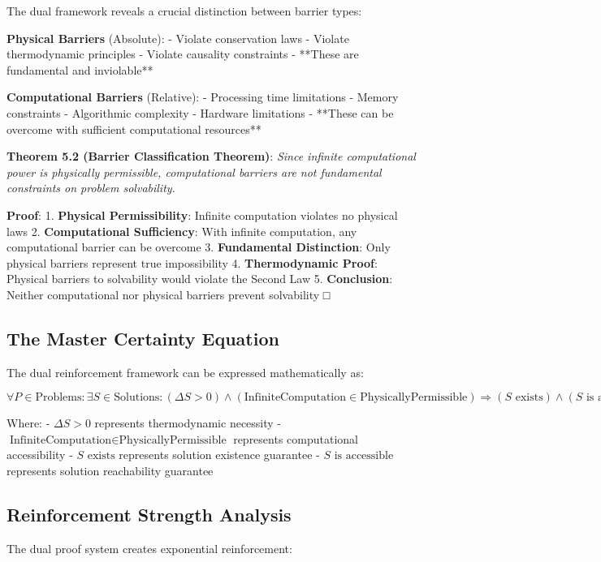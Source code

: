 \documentclass[12pt,a4paper]{article}
\theoremstyle{definition}
\begin{document}
{The dual framework reveals a crucial distinction between barrier types:

\textbf{Physical Barriers} (Absolute):
- Violate conservation laws
- Violate thermodynamic principles
- Violate causality constraints
- **These are fundamental and inviolable**

\textbf{Computational Barriers} (Relative):
- Processing time limitations
- Memory constraints
- Algorithmic complexity
- Hardware limitations
- **These can be overcome with sufficient computational resources**

\textbf{Theorem 5.2 (Barrier Classification Theorem)}: \textit{Since infinite computational power is physically permissible, computational barriers are not fundamental constraints on problem solvability.}

\textbf{Proof}:
1. \textbf{Physical Permissibility}: Infinite computation violates no physical laws
2. \textbf{Computational Sufficiency}: With infinite computation, any computational barrier can be overcome
3. \textbf{Fundamental Distinction}: Only physical barriers represent true impossibility
4. \textbf{Thermodynamic Proof}: Physical barriers to solvability would violate the Second Law
5. \textbf{Conclusion}: Neither computational nor physical barriers prevent solvability □

\subsection{The Master Certainty Equation}

The dual reinforcement framework can be expressed mathematically as:

$$\forall P \in \text{Problems}: \exists S \in \text{Solutions}: (\Delta S > 0) \land (\text{InfiniteComputation} \in \text{PhysicallyPermissible}) \Rightarrow (S \text{ exists}) \land (S \text{ is accessible})$$

Where:
- $\Delta S > 0$ represents thermodynamic necessity
- $\text{InfiniteComputation} \in \text{PhysicallyPermissible}$ represents computational accessibility
- $S \text{ exists}$ represents solution existence guarantee
- $S \text{ is accessible}$ represents solution reachability guarantee

\subsection{Reinforcement Strength Analysis}

The dual proof system creates exponential reinforcement:

}
\end{document}
